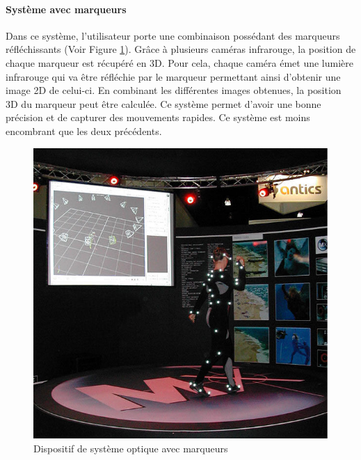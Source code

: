 \paragraph*{Système avec marqueurs}
Dans ce système, l'utilisateur porte une combinaison possédant des marqueurs réfléchissants (Voir Figure \ref{fig5}). Gr\^{a}ce à plusieurs caméras infrarouge, la position de chaque marqueur est récupéré en 3D. Pour cela, chaque caméra émet une lumière infrarouge qui va être réfléchie par le marqueur permettant ainsi d'obtenir une image 2D de celui-ci. En combinant les différentes images obtenues, la position 3D du marqueur peut être calculée. Ce système permet d'avoir une bonne précision et de capturer des mouvements rapides. Ce système est moins encombrant que les deux précédents.
\begin{figure}[!h]
   	\centerline{\includegraphics[scale=0.35]{images/biblio/captureoptic}}
   	\caption{\label{fig5} Dispositif de système optique avec marqueurs}
\end{figure}
